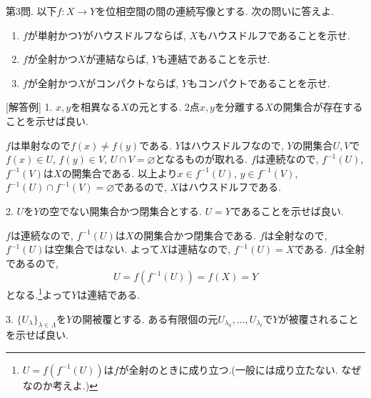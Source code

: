 \documentclass[dvipdfmx,a4paper,11pt]{article}
\theoremstyle{definition}
\begin{document}
{%

 
   {\large 第3問.}  以下$f : X \rightarrow Y$を位相空間の間の連続写像とする. 次の問いに答えよ.
	\begin{enumerate}
	\setlength{\parskip}{0cm}
  	\setlength{\itemsep}{0pt} 
	\item $f$が単射かつ$Y$がハウスドルフならば, $X$もハウスドルフであることを示せ. 
	\item $f$が全射かつ$X$が連結ならば, $Y$も連結であることを示せ. 
	\item $f$が全射かつ$X$がコンパクトならば, $Y$もコンパクトであることを示せ.
	\end{enumerate}

\vspace{10pt}

[解答例] 1. $x,y$を相異なる$X$の元とする. 2点$x,y$を分離する$X$の開集合が存在することを示せば良い. 

$f$は単射なので$f(x) \neq f(y)$である.
$Y$はハウスドルフなので, $Y$の開集合$U, V$で$f(x) \in U$, $f(y) \in V$, $U \cap V = \varnothing$となるものが取れる.
$f$は連続なので, $f^{-1}(U)$, $f^{-1}(V)$は$X$の開集合である.
以上より$x \in f^{-1}(U)$, $y \in f^{-1}(V)$, $f^{-1}(U) \cap f^{-1}(V) = \varnothing$であるので, $X$はハウスドルフである.

2. $U$を$Y$の空でない開集合かつ閉集合とする. $U=Y$であることを示せば良い.

$f$は連続なので, $f^{-1}(U)$は$X$の開集合かつ閉集合である.
$f$は全射なので, $f^{-1}(U)$は空集合ではない.
よって$X$は連結なので, $f^{-1}(U)=X$である.
$f$は全射であるので, 
$$U = f(f^{-1}(U)) = f(X)=Y$$となる.\footnote{$U = f(f^{-1}(U)) $は$f$が全射のときに成り立つ.(一般には成り立たない. なぜなのか考えよ.)}よって$Y$は連結である. 

3. $\{ U_{\lambda}\}_{\lambda \in \Lambda}$を$Y$の開被覆とする.
ある有限個の元$U_{\lambda_0}, \ldots, U_{\lambda_l}$で$Y$が被覆されることを示せば良い.

}
\end{document}
